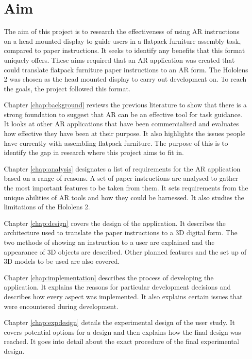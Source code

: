\documentclass{l4proj}
\begin{document}
\section{Aim}

The aim of this project is to research the effectiveness of using AR instructions on a head mounted display to guide users in a flatpack furniture assembly task, compared to paper instructions. It seeks to identify any benefits that this format uniquely offers. These aims required that an AR application was created that could translate flatpack furniture paper instructions to an AR form. The Hololens 2 was chosen as the head mounted display to carry out development on. To reach the goals, the project followed this format.

Chapter \ref{chap:background} reviews the previous literature to show that there is a strong foundation to suggest that AR can be an effective tool for task guidance. It looks at other AR applications that have been commercialised and evaluates how effective they have been at their purpose. It also highlights the issues people have currently with assembling flatpack furniture. The purpose of this is to identify the gap in research where this project aims to fit in.

Chapter \ref{chap:analysis} designates a list of requirements for the AR application based on a range of reasons. A set of paper instructions are analysed to gather the most important features to be taken from them. It sets requirements from the unique abilities of AR tools and how they could be harnessed. It also studies the limitations of the Hololens 2.

Chapter \ref{chap:design} covers the design of the application. It describes the architecture used to translate the paper instructions to a 3D digital form. The two methods of showing an instruction to a user are explained and the appearance of 3D objects are described. Other planned features and the set up of 3D models to be used are also covered.

Chapter \ref{chap:implementation} describes the process of developing the application. It explains the reasons for particular development decisions and describes how every aspect was implemented. It also explains certain issues that were encountered during development.

Chapter \ref{chap:expdesign} details the experimental design of the user study. It covers potential options for a design and then explains how the final design was reached. It goes into detail about the exact procedure of the final experimental design.
\end{document}
